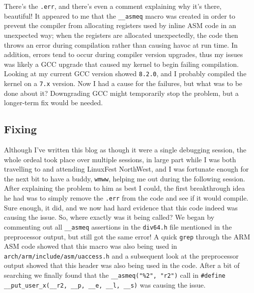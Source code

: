 \documentclass{article}
\begin{document}
There's the \texttt{.err}, and there's even a comment explaining why it's there, beautiful!  It appeared to me that the \texttt{__asmeq} macro was created in order to prevent the compiler from allocating registers used by inline ASM code in an unexpected way; when the registers are allocated unexpectedly, the code then throws an error during compilation rather than causing havoc at run time.  In addition, errors tend to occur during compiler version upgrades, thus my issues was likely a GCC upgrade that caused my kernel to begin failing compilation.  Looking at my current GCC version showed \texttt{8.2.0}, and I probably compiled the kernel on a \texttt{7.x} version.  Now I had a cause for the failures, but what was to be done about it?  Downgrading GCC might temporarily stop the problem, but a longer-term fix would be needed.

\subsection{Fixing}

Although I've written this blog as though it were a single debugging session, the whole ordeal took place over multiple sessions, in large part while I was both travelling to and attending LinuxFest NorthWest, and I was fortunate enough for the next bit to have a buddy, \texttt{wmww}, helping me out during the following session.  After explaining the problem to him as best I could, the first breakthrough idea he had was to simply remove the \texttt{.err} from the code and see if it would compile.  Sure enough, it did, and we now had hard evidence that this code indeed was causing the issue.  So, where exactly was it being called?  We began by commenting out all \texttt{__asmeq} assertions in the \texttt{div64.h} file mentioned in the preprocessor output, but still got the same error!  A quick \texttt{grep} through the ARM ASM code showed that this macro was also being used in \texttt{arch/arm/include/asm/uaccess.h} and a subsequent look at the preprocessor output showed that this header was also being used in the code.  After a bit of searching we finally found that the \texttt{__asmeq("\%2", "r2")} call in \verb|#define __put_user_x(__r2, __p, __e, __l, __s)| was causing the issue.
\end{document}
